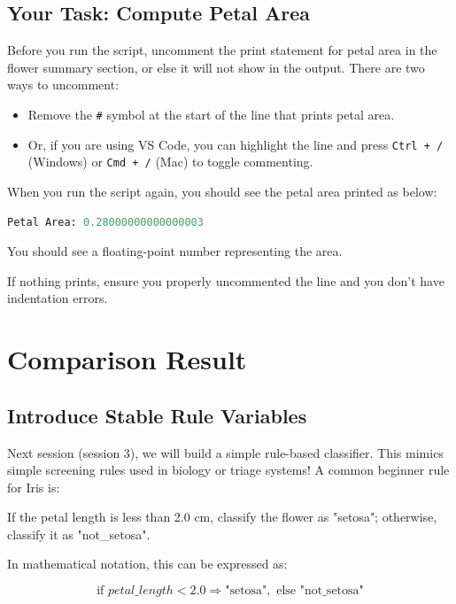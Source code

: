 \subsection{Your Task: Compute Petal Area}
Before you run the script, uncomment the print statement for petal area in the flower summary section, or else it will not show in the output. There are two ways to uncomment:
\begin{itemize}
    \item Remove the \texttt{\#} symbol at the start of the line that prints petal area.
    \item Or, if you are using VS Code, you can highlight the line and press \texttt{Ctrl + /} (Windows) or \texttt{Cmd + /} (Mac) to toggle commenting.
\end{itemize}

When you run the script again, you should see the petal area printed as below:
\begin{lstlisting}[language=Python]
Petal Area: 0.28000000000000003
\end{lstlisting}

\begin{tcolorbox}[title=Checkpoint]
You should see a floating-point number representing the area.
\end{tcolorbox}
\begin{tcolorbox}[title=Common Mistakes]
If nothing prints, ensure you properly uncommented the line and you don't have indentation errors.
\end{tcolorbox}

\section{Comparison Result}
\subsection{Introduce Stable Rule Variables}

Next session (session 3), we will build a simple rule-based classifier. This mimics simple screening rules used in biology or triage systems!
A common beginner rule for Iris is:

If the petal length is less than 2.0 cm, classify the flower as "setosa"; otherwise, classify it as "not\_setosa".

In mathematical notation, this can be expressed as:

\[
    \text{if } petal\_length < 2.0 \Rightarrow \text{"setosa"}, \text{ else "not\_setosa"}
\]

